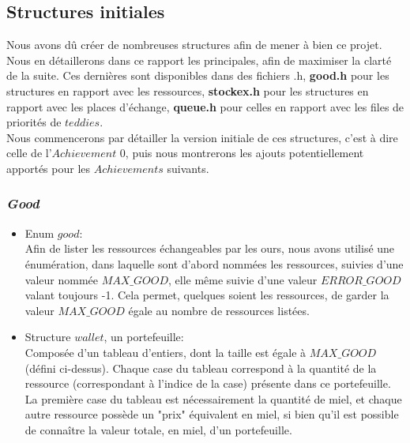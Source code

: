 \documentclass{article}
\begin{document}
\subsection{Structures initiales}
Nous avons dû créer de nombreuses structures afin de mener à bien ce projet. Nous en détaillerons dans ce rapport les principales, afin de maximiser la clarté de la suite. Ces dernières sont disponibles dans des fichiers .h, \textbf{good.h} pour les structures en rapport avec les ressources, \textbf{stockex.h}  pour les structures en rapport avec les places d'échange, \textbf{queue.h} pour celles en rapport avec les files de priorités de $teddies$. \\
Nous commencerons par détailler la version initiale de ces structures, c'est à dire celle de l'$Achievement$ 0, puis nous montrerons les ajouts potentiellement apportés pour les $Achievements$ suivants.  

\subsubsection{\textit{Good}}
   \begin{itemize}
        \item Enum $good$: \\
        Afin de lister les ressources échangeables par les ours, nous avons utilisé une énumération, dans laquelle sont d'abord nommées les ressources, suivies d'une valeur nommée $MAX\_GOOD$, elle même suivie d'une valeur $ERROR\_GOOD$ valant toujours -1. Cela permet, quelques soient les ressources, de garder la valeur $MAX\_GOOD$ égale au nombre de ressources listées. 
        \item Structure $wallet$, un portefeuille:\\
        Composée d'un tableau d'entiers, dont la taille est égale à $MAX\_GOOD$ (défini ci-dessus). Chaque case du tableau correspond à la quantité de la ressource (correspondant à l'indice de la case) présente dans ce portefeuille. La première case du tableau est nécessairement la quantité de miel, et chaque autre ressource possède un "prix" équivalent en miel, si bien qu'il est possible de connaître la valeur totale, en miel, d'un portefeuille.
    \end{itemize}
\end{document}
